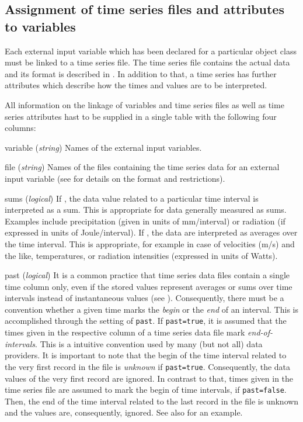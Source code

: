 \subsection{Assignment of time series files and attributes to variables} \label{sec:input-externalVariables}

Each external input variable which has been declared for a particular object class must be linked to a time series file. The time series file contains the actual data and its format is described in . In addition to that, a time series has further attributes which describe how the times and values are to be interpreted.

All information on the linkage of variables and time series files as well as time series attributes hast to be supplied in a single table with the following four columns:

\begin{columndef}
  \item [variable] (\textit{string}) Names of the external input variables.
  \item [file] (\textit{string}) Names of the files containing the time series data for an external input variable (see  for details on the format and restrictions).
  \item [sums] (\textit{logical}) If \true{}, the data value related to a particular time interval is interpreted as a sum. This is appropriate for data generally measured as sums. Examples include precipitation (given in units of mm/interval) or radiation (if expressed in units of Joule/interval). If \false{}, the data are interpreted as averages over the time interval. This is appropriate, for example in case of velocities (m/s) and the like, temperatures, or radiation intensities (expressed in units of Watts).
  \item [past] (\textit{logical}) It is a common practice that time series data files contain a single time column only, even if the stored values represent averages or sums over time intervals instead of instantaneous values (see ). Consequently, there must be a convention whether a given time marks the \emph{begin} or the \emph{end} of an interval. This is accomplished through the setting of \verb!past!. If \verb!past=true!, it is assumed that the times given in the respective column of a time series data file mark \emph{end-of-intervals}. This is a intuitive convention used by many (but not all) data providers. It is important to note that the begin of the time interval related to the very first record in the file is \emph{unknown} if \verb!past=true!. Consequently, the data values of the very first record are ignored. In contrast to that, times given in the time series file are assumed to mark the begin of time intervals, if \verb!past=false!. Then, the end of the time interval related to the last record in the file is unknown and the values are, consequently, ignored. See also  for an example.
\end{columndef}


